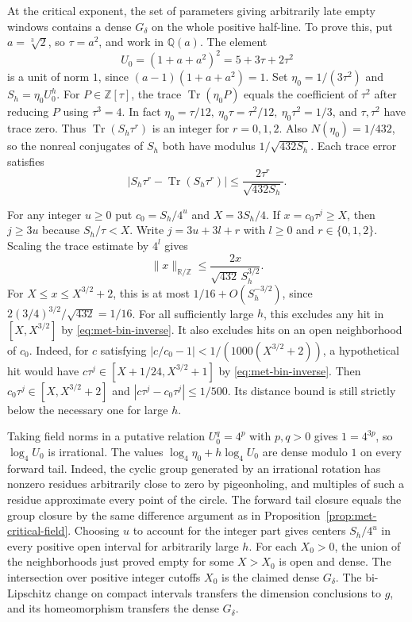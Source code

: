 \documentclass[11pt,reqno,a4paper]{amsart}
\theoremstyle{remark}
\begin{document}
At the critical exponent, the set of parameters giving arbitrarily
late empty windows contains a dense \(G_\delta\) on the whole positive
half-line. To prove this, put \(a=\sqrt[3]{2}\), so \(\tau=a^2\),
and work in \(\mathbb Q(a)\). The element
\[
 U_0=(1+a+a^2)^2=5+3\tau+2\tau^2
\]
is a unit of norm \(1\), since \((a-1)(1+a+a^2)=1\).
Set \(\eta_0=1/(3\tau^2)\) and \(S_h=\eta_0U_0^h\).
For \(P\in\mathbb Z[\tau]\), the trace
\(\operatorname{Tr}(\eta_0P)\) equals the coefficient of \(\tau^2\)
after reducing \(P\) using \(\tau^3=4\). In fact
\(\eta_0=\tau/12,\ \eta_0\tau=\tau^2/12,\ \eta_0\tau^2=1/3\),
and \(\tau,\tau^2\) have trace zero. Thus
\(\operatorname{Tr}(S_h\tau^r)\) is an integer for \(r=0,1,2\).
Also \(N(\eta_0)=1/432\), so the nonreal conjugates of \(S_h\)
both have modulus \(1/\sqrt{432S_h}\). Each trace error satisfies
\[
  \big|S_h\tau^r-\operatorname{Tr}(S_h\tau^r)\big|
       \leq\frac{2\tau^r}{\sqrt{432S_h}} .
\]

For any integer \(u\geq0\) put \(c_0=S_h/4^u\) and \(X=3S_h/4\).
If \(x=c_0\tau^j\geq X\), then \(j\geq3u\) because
\(S_h/\tau<X\). Write \(j=3u+3l+r\) with \(l\geq0\) and
\(r\in\{0,1,2\}\). Scaling the trace estimate by \(4^l\) gives
\[
 \|x\|_{\mathbb R/\mathbb Z}\leq
    \frac{2x}{\sqrt{432}\,S_h^{3/2}} .
\]
For \(X\leq x\leq X^{3/2}+2\), this is at most
\(1/16+O(S_h^{-3/2})\), since
\(2(3/4)^{3/2}/\sqrt{432}=1/16\).
For all sufficiently large \(h\), this excludes any hit in
\([X,X^{3/2}]\) by \eqref{eq:met-bin-inverse}. It also excludes
hits on an open neighborhood of \(c_0\). Indeed, for \(c\)
satisfying \(|c/c_0-1|<1/(1000(X^{3/2}+2))\), a hypothetical
hit would have \(c\tau^j\in[X+1/24,X^{3/2}+1]\) by
\eqref{eq:met-bin-inverse}. Then \(c_0\tau^j\in[X,X^{3/2}+2]\)
and \(|c\tau^j-c_0\tau^j|\leq1/500\). Its distance bound is
still strictly below the necessary one for large \(h\).

Taking field norms in a putative relation \(U_0^q=4^p\) with
\(p,q>0\) gives \(1=4^{3p}\), so \(\log_4 U_0\) is irrational.
The values \(\log_4\eta_0+h\log_4 U_0\) are dense modulo \(1\)
on every forward tail. Indeed, the cyclic group generated by
an irrational rotation has nonzero residues arbitrarily close
to zero by pigeonholing, and multiples of such a residue
approximate every point of the circle. The forward tail closure
equals the group closure by the same difference argument as
in Proposition~\ref{prop:met-critical-field}. Choosing \(u\) to
account for the integer part gives centers \(S_h/4^u\) in every
positive open interval for arbitrarily large \(h\).
For each \(X_0>0\), the union of the neighborhoods just proved
empty for some \(X>X_0\) is open and dense. The intersection
over positive integer cutoffs \(X_0\) is the claimed dense
\(G_\delta\). The bi-Lipschitz change on compact intervals
transfers the dimension conclusions to \(g\), and its
homeomorphism transfers the dense \(G_\delta\).
\end{document}
